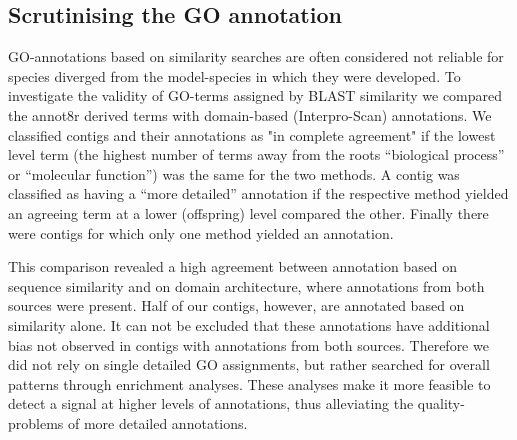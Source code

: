 \documentclass[12pt,a4paper]{article}
\begin{document}
\newpage

\subsection{Scrutinising the GO annotation}
\label{sec:scrut-GO}

GO-annotations based on similarity searches are often considered not
reliable for species diverged from the model-species in which they
were developed. To investigate the validity of GO-terms assigned by
BLAST similarity we compared the annot8r derived terms with
domain-based (Interpro-Scan) annotations. We classified contigs and
their annotations as "in complete agreement" if the lowest level term
(the highest number of terms away from the roots ``biological
process'' or ``molecular function'') was the same for the two methods.
A contig was classified as having a ``more detailed'' annotation if
the respective method yielded an agreeing term at a lower (offspring)
level compared the other. Finally there were contigs for which only
one method yielded an annotation.

This comparison revealed a high agreement between annotation based on
sequence similarity and on domain architecture, where annotations from
both sources were present. Half of our contigs, however, are annotated
based on similarity alone. It can not be excluded that these
annotations have additional bias not observed in contigs with
annotations from both sources. Therefore we did not rely on single
detailed GO assignments, but rather searched for overall patterns
through enrichment analyses. These analyses make it more feasible to
detect a signal at higher levels of annotations, thus alleviating the
quality-problems of more detailed annotations.
\end{document}
